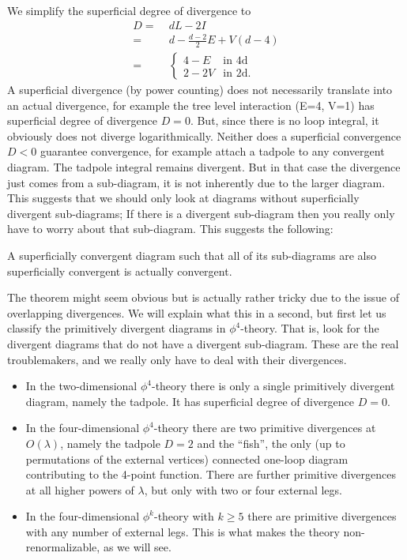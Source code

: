 \documentclass[12pt]{article}
\begin{document}
We simplify the superficial degree of divergence to 
\begin{equation}
  \begin{split}
    D =&\; dL - 2I
    \\ =&\;
    d - \frac{d-2}{2}E + V(d-4)
    \\ =&\;
    \begin{cases}
      4-E & \text{in 4d} \\
      2-2V & \text{in 2d}.
    \end{cases}
  \end{split}
\end{equation}
A superficial divergence (by power counting) does not necessarily
translate into an actual divergence, for example the tree level
interaction (E=4, V=1) has superficial degree of divergence
$D=0$. But, since there is no loop integral, it obviously does not
diverge logarithmically. Neither does a superficial convergence $D<0$
guarantee convergence, for example attach a tadpole to any convergent
diagram. The tadpole integral remains divergent. But in that case the
divergence just comes from a sub-diagram, it is not inherently due to
the larger diagram. This suggests that we should only look at diagrams
without superficially divergent sub-diagrams; If there is a divergent
sub-diagram then you really only have to worry about that
sub-diagram. This suggests the following:
\begin{theorem}
  A superficially convergent diagram such that all of its sub-diagrams are
  also superficially convergent is actually convergent.
\end{theorem}
The theorem might seem obvious but is actually rather tricky due to
the issue of overlapping divergences. We will explain what this in a
second, but first let us classify the primitively divergent diagrams
in $\phi^4$-theory. That is, look for the divergent diagrams that do
not have a divergent sub-diagram. These are the real troublemakers,
and we really only have to deal with their divergences.
\begin{itemize}
\item In the two-dimensional $\phi^4$-theory there is only a single
  primitively divergent diagram, namely the tadpole. It has
  superficial degree of divergence $D=0$.
\item In the four-dimensional $\phi^4$-theory there are two primitive
  divergences at $O(\lambda)$, namely the tadpole $D=2$ and the
  ``fish'', the only (up to permutations of the external vertices)
  connected one-loop diagram contributing to the 4-point
  function. There are further primitive divergences at all higher
  powers of $\lambda$, but only with two or four external legs.
\item In the four-dimensional $\phi^k$-theory with $k\geq 5$ there are
  primitive divergences with any number of external legs. This is what
  makes the theory non-renormalizable, as we will see.
\end{itemize}
\end{document}
